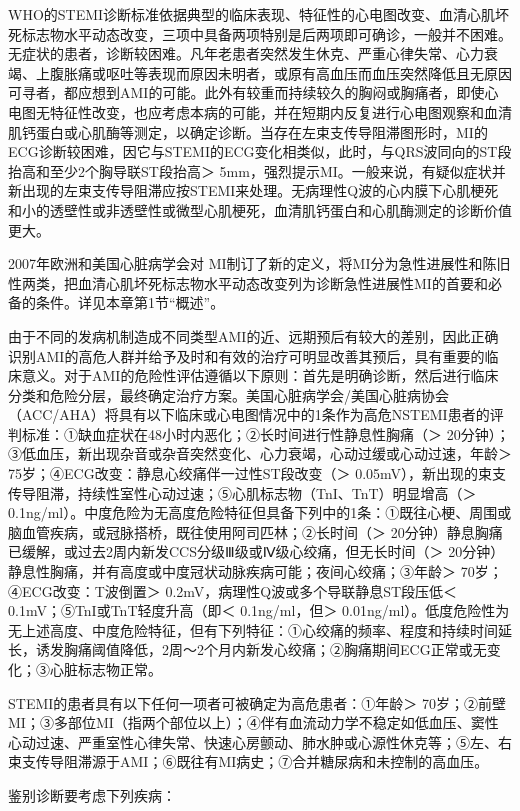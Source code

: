 WHO的STEMI诊断标准依据典型的临床表现、特征性的心电图改变、血清心肌坏死标志物水平动态改变，三项中具备两项特别是后两项即可确诊，一般并不困难。无症状的患者，诊断较困难。凡年老患者突然发生休克、严重心律失常、心力衰竭、上腹胀痛或呕吐等表现而原因未明者，或原有高血压而血压突然降低且无原因可寻者，都应想到AMI的可能。此外有较重而持续较久的胸闷或胸痛者，即使心电图无特征性改变，也应考虑本病的可能，并在短期内反复进行心电图观察和血清肌钙蛋白或心肌酶等测定，以确定诊断。当存在左束支传导阻滞图形时，MI的ECG诊断较困难，因它与STEMI的ECG变化相类似，此时，与QRS波同向的ST段抬高和至少2个胸导联ST段抬高＞
5mm，强烈提示MI。一般来说，有疑似症状并新出现的左束支传导阻滞应按STEMI来处理。无病理性Q波的心内膜下心肌梗死和小的透壁性或非透壁性或微型心肌梗死，血清肌钙蛋白和心肌酶测定的诊断价值更大。

2007年欧洲和美国心脏病学会对
MI制订了新的定义，将MI分为急性进展性和陈旧性两类，把血清心肌坏死标志物水平动态改变列为诊断急性进展性MI的首要和必备的条件。详见本章第1节“概述”。

由于不同的发病机制造成不同类型AMI的近、远期预后有较大的差别，因此正确识别AMI的高危人群并给予及时和有效的治疗可明显改善其预后，具有重要的临床意义。对于AMI的危险性评估遵循以下原则：首先是明确诊断，然后进行临床分类和危险分层，最终确定治疗方案。美国心脏病学会/美国心脏病协会（ACC/AHA）将具有以下临床或心电图情况中的1条作为高危NSTEMI患者的评判标准：①缺血症状在48小时内恶化；②长时间进行性静息性胸痛（＞
20分钟）；③低血压，新出现杂音或杂音突然变化、心力衰竭，心动过缓或心动过速，年龄＞
75岁；④ECG改变：静息心绞痛伴一过性ST段改变（＞
0.05mV），新出现的束支传导阻滞，持续性室性心动过速；⑤心肌标志物（TnI、TnT）明显增高（＞
0.1ng/ml）。中度危险为无高度危险特征但具备下列中的1条：①既往心梗、周围或脑血管疾病，或冠脉搭桥，既往使用阿司匹林；②长时间（＞
20分钟）静息胸痛已缓解，或过去2周内新发CCS分级Ⅲ级或Ⅳ级心绞痛，但无长时间（＞
20分钟）静息性胸痛，并有高度或中度冠状动脉疾病可能；夜间心绞痛；③年龄＞
70岁；④ECG改变：T波倒置＞ 0.2mV，病理性Q波或多个导联静息ST段压低＜
0.1mV；⑤TnI或TnT轻度升高（即＜ 0.1ng/ml，但＞
0.01ng/ml）。低度危险性为无上述高度、中度危险特征，但有下列特征：①心绞痛的频率、程度和持续时间延长，诱发胸痛阈值降低，2周～2个月内新发心绞痛；②胸痛期间ECG正常或无变化；③心脏标志物正常。

STEMI的患者具有以下任何一项者可被确定为高危患者：①年龄＞
70岁；②前壁MI；③多部位MI（指两个部位以上）；④伴有血流动力学不稳定如低血压、窦性心动过速、严重室性心律失常、快速心房颤动、肺水肿或心源性休克等；⑤左、右束支传导阻滞源于AMI；⑥既往有MI病史；⑦合并糖尿病和未控制的高血压。

鉴别诊断要考虑下列疾病：


